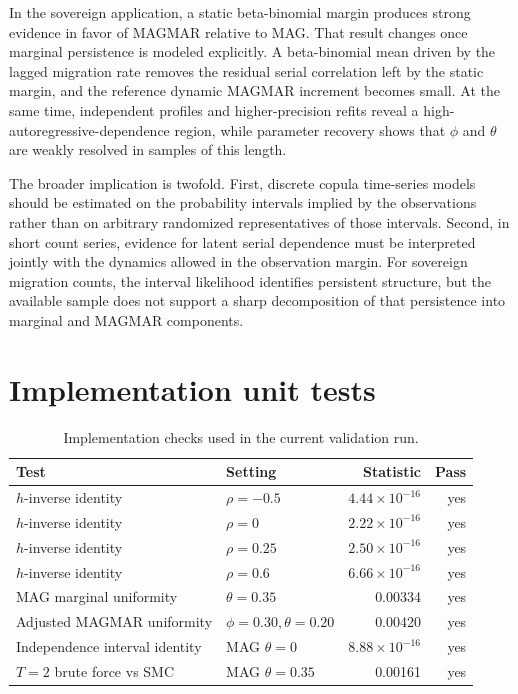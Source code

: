 \documentclass[11pt]{article}
\theoremstyle{definition}
\begin{document}
In the sovereign application, a static beta-binomial margin produces strong evidence
in favor of MAGMAR relative to MAG. That result changes once marginal persistence is
modeled explicitly. A beta-binomial mean driven by the lagged migration rate removes
the residual serial correlation left by the static margin, and the reference dynamic
MAGMAR increment becomes small. At the same time, independent profiles and
higher-precision refits reveal a high-autoregressive-dependence region, while
parameter recovery shows that $\phi$ and $\theta$ are weakly resolved in samples of
this length.

The broader implication is twofold. First, discrete copula time-series models should
be estimated on the probability intervals implied by the observations rather than
on arbitrary randomized representatives of those intervals. Second, in short count
series, evidence for latent serial dependence must be interpreted jointly with the
dynamics allowed in the observation margin. For sovereign migration counts, the
interval likelihood identifies persistent structure, but the available sample does
not support a sharp decomposition of that persistence into marginal and MAGMAR
components.

\appendix

\section{Implementation unit tests}
\label{app:unit-tests}

\begin{table}[H]
\centering
\caption{Implementation checks used in the current validation run.}
\label{tab:unit-tests}
\small
\begin{tabular}{p{}p{}rr}
\toprule
Test & Setting & Statistic & Pass \\
\midrule
$h$-inverse identity & $\rho=-0.5$ & $4.44\times10^{-16}$ & yes \\
$h$-inverse identity & $\rho=0$ & $2.22\times10^{-16}$ & yes \\
$h$-inverse identity & $\rho=0.25$ & $2.50\times10^{-16}$ & yes \\
$h$-inverse identity & $\rho=0.6$ & $6.66\times10^{-16}$ & yes \\
MAG marginal uniformity & $\theta=0.35$ & 0.00334 & yes \\
Adjusted MAGMAR uniformity & $\phi=0.30,\theta=0.20$ & 0.00420 & yes \\
Independence interval identity & MAG $\theta=0$ & $8.88\times10^{-16}$ & yes \\
$T=2$ brute force vs SMC & MAG $\theta=0.35$ & 0.00161 & yes \\
\bottomrule
\end{tabular}
\end{table}
\end{document}
